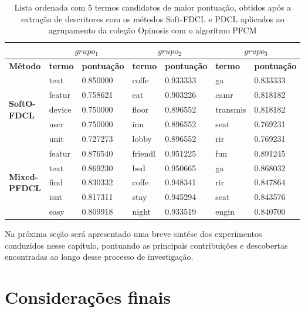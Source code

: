 \begin{table}[!h]
  \centering
  \begin{tabular}{ | l | l l | l l | l l |}
    \hline
    & \multicolumn{2}{c|}{$grupo_1$} & \multicolumn{2}{c|}{$grupo_2$} &
    \multicolumn{2}{c|}{$grupo_3$} \\
    \hline
    {\bf Método} & {\bf termo} & {\bf pontuação} & {\bf termo} & {\bf pontuação} & {\bf termo} &
    {\bf pontuação} \\
    \hline
 \multirow{5}{*}{{\bf SoftO-FDCL}} & text   & 0.850000 & coffe  &  0.933333 &  ga     & 0.833333 \\
                                    & featur & 0.758621 & eat   &  0.903226 &  camr   & 0.818182 \\
                                    & device  & 0.750000 & floor   &  0.896552 &  transmis & 0.818182 \\
                                    & user   & 0.750000 & inn   &  0.896552 &  seat   & 0.769231 \\
                                    & unit   & 0.727273 & lobby  &  0.896552 &  rir    & 0.769231 \\
    \hline
 \multirow{5}{*}{{\bf Mixed-PFDCL}} & featur & 0.876540 & friendl & 0.951225 & fun & 0.891245  \\
&  text          &  0.869230  &  bed           &  0.950665  &  ga            &  0.868032  \\
&  find          &  0.830332  &  coffe          &  0.948341  &  rir           &  0.847864  \\
&  isnt           &  0.817311  &  stay           &  0.945294  &  seat          &  0.843576  \\
&  easy           &  0.809918  &  night         &  0.933519  &  engin         &  0.840700  \\
    \hline
  \end{tabular}
  \caption{Lista ordenada com 5 termos candidatos de maior pontuação, obtidos após a extração de
  descritores com os métodos Soft-FDCL e PDCL aplicados ao agrupamento da coleção Opinosis com o
algoritmo PFCM}
  \label{table:rankingmixedpdcl}
\end{table}

Na próxima seção será apresentado uma breve sintése dos experimentos conduzidos nesse capítulo,
pontuando as principais contribuições e descobertas encontradas ao longo desse processo de
investigação.

\section{Considerações finais}

